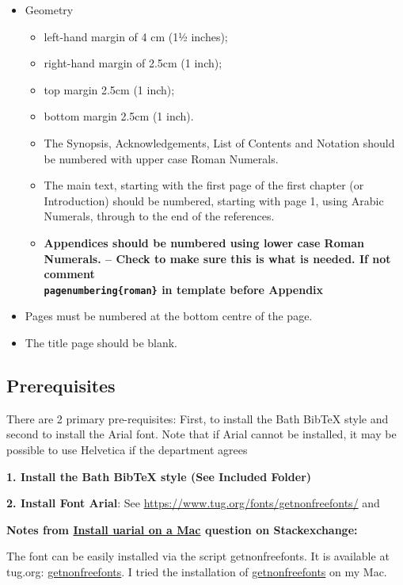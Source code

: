 \begin{itemize}
	\item Geometry
	\begin{itemize}
		\item left-hand margin of 4 cm (11⁄2 inches);
		\item right-hand margin of 2.5cm (1 inch);
		\item top margin 2.5cm (1 inch);
		\item bottom margin 2.5cm (1 inch).
	\end{itemize}
	\begin{itemize}
		\item The Synopsis, Acknowledgements, List of Contents and Notation should be numbered with upper case Roman Numerals.
		\item The main text, starting with the first page of the first chapter (or Introduction) should be numbered, starting with page 1, using Arabic Numerals, through to the end of the references.
		\item \textbf{Appendices should be numbered using lower case Roman Numerals. -- Check to make sure this is what is needed. If not comment \texttt{\\pagenumbering\{roman\}} in template before Appendix}
	\end{itemize}
	\item Pages must be numbered at the bottom centre of the page.
	\item The title page should be blank.
\end{itemize}

\subsection{Prerequisites}

There are 2 primary pre-requisites: First, to install the Bath BibTeX style and second to install the Arial font. Note that if Arial cannot be installed, it may be possible to use Helvetica if the department agrees 

\textbf{1. Install the Bath BibTeX style (See Included Folder)}

\textbf{2. Install Font Arial}: See \hyperlink{https://www.tug.org/fonts/getnonfreefonts/}{https://www.tug.org/fonts/getnonfreefonts/} and 

\textbf{Notes from \hyperlink{https://tex.stackexchange.com/questions/37120/how-can-i-install-uarial-sty-on-a-mac}{Install uarial on a Mac} question on Stackexchange: }

The font can be easily installed via the script getnonfreefonts. It is available at tug.org: \hyperlink{http://www.tug.org/fonts/getnonfreefonts/}{getnonfreefonts}. I tried the installation of \hyperlink{http://www.tug.org/fonts/getnonfreefonts/install-getnonfreefonts}{getnonfreefonts} on my Mac.

